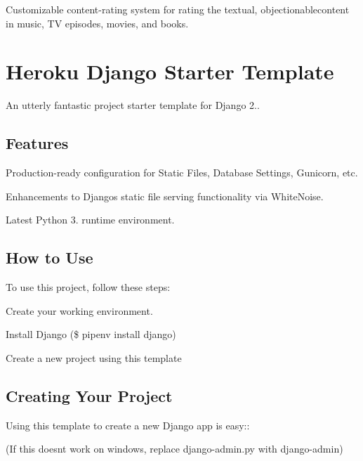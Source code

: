 Customizable content-\/rating system for rating the textual, objectionablecontent in music, TV episodes, movies, and books.

\section*{Heroku Django Starter Template}

An utterly fantastic project starter template for Django 2..

\subsection*{Features}


\begin{DoxyItemize}
\item Production-\/ready configuration for Static Files, Database Settings, Gunicorn, etc.
\item Enhancements to Django\textquotesingle{}s static file serving functionality via White\+Noise.
\item Latest Python 3. runtime environment.
\end{DoxyItemize}

\subsection*{How to Use}

To use this project, follow these steps\+:


\begin{DoxyEnumerate}
\item Create your working environment.
\item Install Django ({\ttfamily \$ pipenv install django})
\item Create a new project using this template
\end{DoxyEnumerate}

\subsection*{Creating Your Project}

Using this template to create a new Django app is easy\+:\+: 


(If this doesn\textquotesingle{}t work on windows, replace {\ttfamily django-\/admin.\+py} with {\ttfamily django-\/admin})

